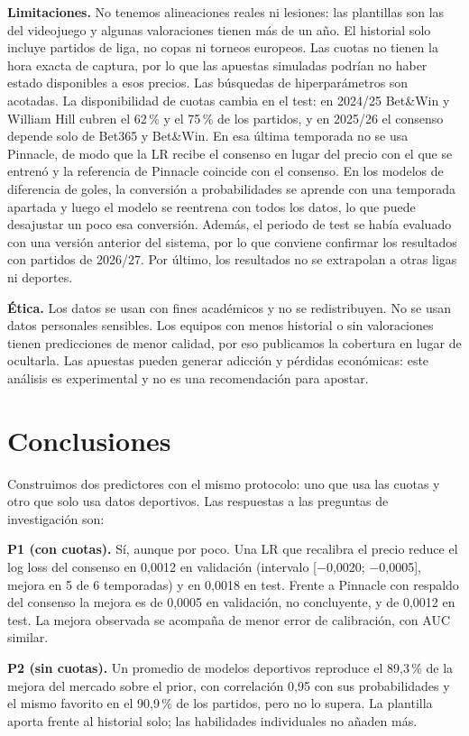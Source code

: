 \documentclass[conference]{IEEEtran}
\begin{document}
\textbf{Limitaciones.} No tenemos alineaciones reales ni lesiones: las plantillas son las del videojuego y algunas valoraciones tienen más de un año. El historial solo incluye partidos de liga, no copas ni torneos europeos. Las cuotas no tienen la hora exacta de captura, por lo que las apuestas simuladas podrían no haber estado disponibles a esos precios. Las búsquedas de hiperparámetros son acotadas. La disponibilidad de cuotas cambia en el test: en 2024/25 Bet\&Win y William Hill cubren el 62\,\% y el 75\,\% de los partidos, y en 2025/26 el consenso depende solo de Bet365 y Bet\&Win. En esa última temporada no se usa Pinnacle, de modo que la LR recibe el consenso en lugar del precio con el que se entrenó y la referencia de Pinnacle coincide con el consenso. En los modelos de diferencia de goles, la conversión a probabilidades se aprende con una temporada apartada y luego el modelo se reentrena con todos los datos, lo que puede desajustar un poco esa conversión. Además, el periodo de test se había evaluado con una versión anterior del sistema, por lo que conviene confirmar los resultados con partidos de 2026/27. Por último, los resultados no se extrapolan a otras ligas ni deportes.

\textbf{Ética.} Los datos se usan con fines académicos y no se redistribuyen. No se usan datos personales sensibles. Los equipos con menos historial o sin valoraciones tienen predicciones de menor calidad, por eso publicamos la cobertura en lugar de ocultarla. Las apuestas pueden generar adicción y pérdidas económicas: este análisis es experimental y no es una recomendación para apostar.

\section{Conclusiones}
\label{sec:conclusiones}
Construimos dos predictores con el mismo protocolo: uno que usa las cuotas y otro que solo usa datos deportivos. Las respuestas a las preguntas de investigación son:

\textbf{P1 (con cuotas).} Sí, aunque por poco. Una LR que recalibra el precio reduce el log loss del consenso en 0{,}0012 en validación (intervalo [$-$0{,}0020; $-$0{,}0005], mejora en 5 de 6 temporadas) y en 0{,}0018 en test. Frente a Pinnacle con respaldo del consenso la mejora es de 0{,}0005 en validación, no concluyente, y de 0{,}0012 en test. La mejora observada se acompaña de menor error de calibración, con AUC similar.

\textbf{P2 (sin cuotas).} Un promedio de modelos deportivos reproduce el 89{,}3\,\% de la mejora del mercado sobre el prior, con correlación 0{,}95 con sus probabilidades y el mismo favorito en el 90{,}9\,\% de los partidos, pero no lo supera. La plantilla aporta frente al historial solo; las habilidades individuales no añaden más.
\end{document}
